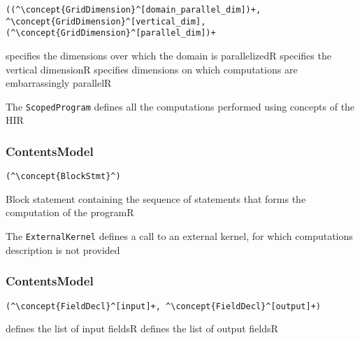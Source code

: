 \begin{lstlisting}[style=default]
((^\concept{GridDimension}^[domain_parallel_dim])+, ^\concept{GridDimension}^[vertical_dim], (^\concept{GridDimension}^[parallel_dim])+
\end{lstlisting}

\begin{HIRChildElements}
	{specifies the dimensions over which the domain is parallelized}{R}
	{specifies the vertical dimension}{R}
	{specifies dimensions on which computations are embarrassingly parallel}{R}	
\end{HIRChildElements}


The {\tt ScopedProgram} defines all the computations performed using concepts of the HIR

\subsubsection*{ContentsModel}{}

\begin{lstlisting}[style=default]
(^\concept{BlockStmt}^)
\end{lstlisting}

\begin{HIRChildElements}
	{Block statement containing the sequence of statements that forms the computation of the program}{R}
\end{HIRChildElements}


The {\tt ExternalKernel} defines a call to an external kernel, for which computations description is not provided

\subsubsection*{ContentsModel}{}

\begin{lstlisting}[style=default]
(^\concept{FieldDecl}^[input]+, ^\concept{FieldDecl}^[output]+)
\end{lstlisting}

\begin{HIRChildElements}
	{defines the list of input fields}{R}
	{defines the list of output fields}{R}
		
\end{HIRChildElements}


